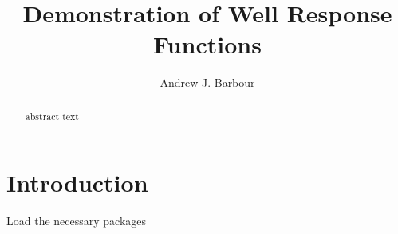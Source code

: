 \documentclass[10pt]{article}\usepackage[]{graphicx}\usepackage[]{color}
\author{Andrew J. Barbour}
\title{Demonstration of Well Response Functions}
\begin{document}
\maketitle
%
\newcommand{\SC}[1]{\textsc{#1}}
\newcommand{\Rcmd}[1]{\texttt{#1}}
\newcommand{\bidxa}[1]{\index{#1}{\textbf{#1}}} 
\newcommand{\bidxb}[2]{\index{#2}{\textbf{#1}}} 
\newcommand{\idxa}[1]{\index{#1}{#1}} 
\newcommand{\idxb}[2]{\index{#2}{#1}} 
%
\begin{abstract}
abstract text
\end{abstract}
%
\section{Introduction}
Load the necessary packages
\end{document}
